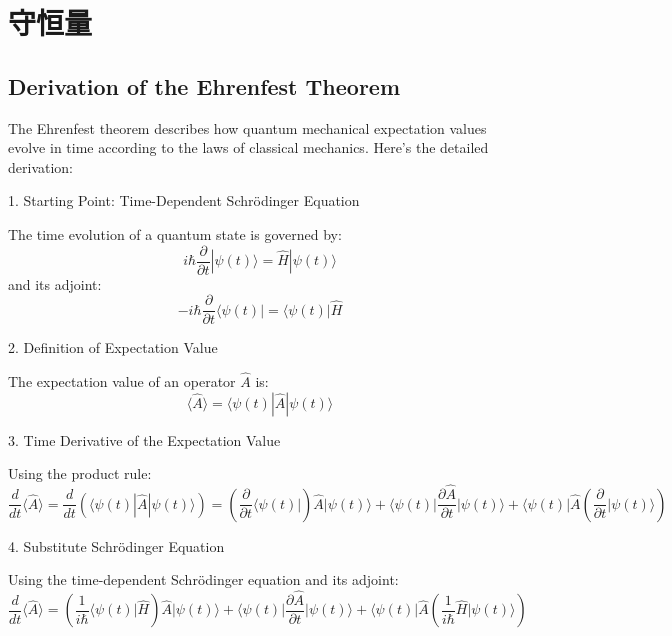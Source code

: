 \section{守恒量}
\subsection{Derivation of the Ehrenfest Theorem}
The Ehrenfest theorem describes how quantum mechanical expectation values evolve in time according to the laws of classical mechanics. Here's the detailed derivation:

1. Starting Point: Time-Dependent Schrödinger Equation

The time evolution of a quantum state is governed by:
\begin{equation}
	i\hbar\frac{\partial}{\partial t}|\psi(t)\rangle = \hat{H}|\psi(t)\rangle
\end{equation}
and its adjoint:
\begin{equation}
	-i\hbar\frac{\partial}{\partial t}\langle\psi(t)| = \langle\psi(t)|\hat{H}
\end{equation}

2. Definition of Expectation Value

The expectation value of an operator $\hat{A}$ is:
\begin{equation}
	\langle\hat{A}\rangle = \langle\psi(t)|\hat{A}|\psi(t)\rangle
\end{equation}

3. Time Derivative of the Expectation Value

Using the product rule:
\begin{equation}
	\frac{d}{dt}\langle\hat{A}\rangle = \frac{d}{dt}\left(\langle\psi(t)|\hat{A}|\psi(t)\rangle\right)
	= \left(\frac{\partial}{\partial t}\langle\psi(t)|\right)\hat{A}|\psi(t)\rangle + \langle\psi(t)|\frac{\partial\hat{A}}{\partial t}|\psi(t)\rangle + \langle\psi(t)|\hat{A}\left(\frac{\partial}{\partial t}|\psi(t)\rangle\right)
\end{equation}

4. Substitute Schrödinger Equation

Using the time-dependent Schrödinger equation and its adjoint:
\begin{equation}
	\frac{d}{dt}\langle\hat{A}\rangle = \left(\frac{1}{i\hbar}\langle\psi(t)|\hat{H}\right)\hat{A}|\psi(t)\rangle + \langle\psi(t)|\frac{\partial\hat{A}}{\partial t}|\psi(t)\rangle + \langle\psi(t)|\hat{A}\left(\frac{1}{i\hbar}\hat{H}|\psi(t)\rangle\right)
\end{equation}

